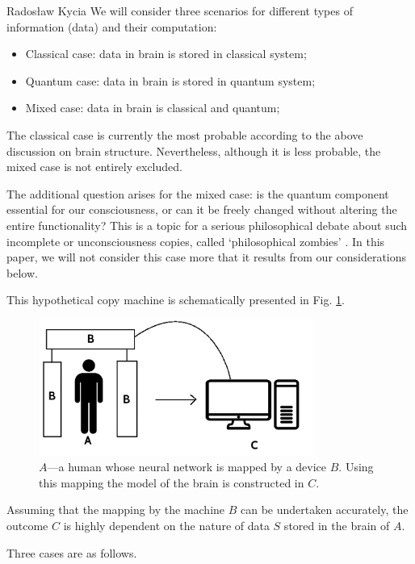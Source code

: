 \begin{artengenv}{Radosław Kycia}
We will consider three scenarios for different types of information (data) and their computation:
\begin{itemize}
 \item {Classical case: data in brain is stored in classical system;}
 \item {Quantum case: data in brain is stored in quantum system;}
 \item {Mixed case: data in brain is classical and quantum;}
\end{itemize}

The classical case is currently the most probable according to the above discussion on brain structure. Nevertheless, although it is less probable, the mixed case is not entirely excluded.

The additional question arises for the mixed case: is the quantum component essential for our consciousness, or can it be freely changed without altering the entire functionality? This is a topic for a serious philosophical debate about such incomplete or unconsciousness copies, called `philosophical zombies' \parencite[see, e.g.][]{pZombie}. In this paper, we will not consider this case more that it results from our considerations below.

This hypothetical copy machine is schematically presented in Fig. \ref{Fig.BrainTransfer}.
\begin{figure}
\centering
 \includegraphics[width=0.8\textwidth]{kycia/BrainTransfer2.png}
 \caption{$A$---a human whose neural network is mapped by a device $B$. Using this mapping the model of the brain is constructed in $C$.}
 \label{Fig.BrainTransfer}
\end{figure}
Assuming that the mapping by the machine $B$ can be undertaken accurately, the outcome $C$ is highly dependent on the nature of data $S$ stored in the brain of $A$. 

Three cases are as follows.



\end{artengenv}
